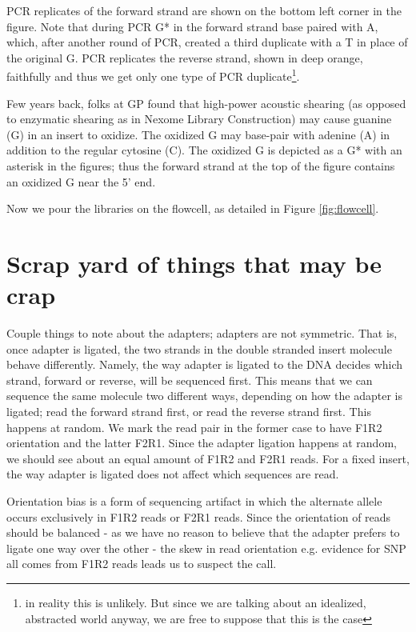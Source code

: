 \documentclass[a4paper]{article}
\begin{document}
PCR replicates of the forward strand are shown on the bottom left corner in the figure. Note that during PCR G* in the forward strand base paired with A, which, after another round of PCR, created a third duplicate with a T in place of the original G. PCR replicates the reverse strand, shown in deep orange, faithfully and thus we get only one type of PCR duplicate\footnote{in reality this is unlikely. But since we are talking about an idealized, abstracted world anyway, we are free to suppose that this is the case}. 

Few years back, folks at GP found that high-power acoustic shearing (as opposed to enzymatic shearing as in Nexome Library Construction) may cause guanine (G) in an insert to oxidize. The oxidized G may base-pair with adenine (A) in addition to the regular cytosine (C). The oxidized G is depicted as a G* with an asterisk in the figures; thus the forward strand at the top of the figure contains an oxidized G near the 5' end.

Now we pour the libraries on the flowcell, as detailed in Figure \ref{fig:flowcell}. 

 
 \section{Scrap yard of things that may be crap}
 
Couple things to note about the adapters; adapters are not symmetric. That is, once adapter is ligated, the two strands in the double stranded insert molecule behave differently. Namely, the way adapter is ligated to the DNA decides which strand, forward or reverse, will be sequenced first. This means that we can sequence the same molecule two different ways, depending on how the adapter is ligated; read the forward strand first, or read the reverse strand first. This happens at random. We mark the read pair in the former case to have F1R2 orientation and the latter F2R1. Since the adapter ligation happens at random, we should see about an equal amount of F1R2 and F2R1 reads. For a fixed insert, the way adapter is ligated does not affect which sequences are read. 

Orientation bias is a form of sequencing artifact in which the alternate allele occurs exclusively in F1R2 reads or F2R1 reads. Since the orientation of reads should be balanced - as we have no reason to believe that the adapter prefers to ligate one way over the other - the skew in read orientation e.g. evidence for SNP all comes from F1R2 reads leads us to suspect the call.
\end{document}
